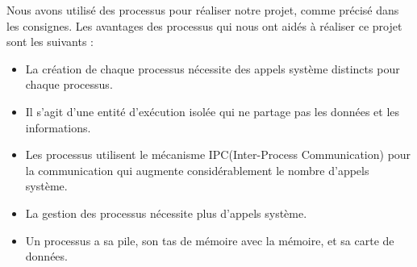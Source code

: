 \documentclass[utf8]{article}
\begin{document}
Nous avons utilisé des processus pour réaliser notre projet, comme précisé dans les consignes. Les avantages des processus qui nous ont aidés à réaliser ce projet sont les suivants :\\
\begin{itemize}
    \item La création de chaque processus nécessite des appels système distincts pour chaque processus.\\
    \item Il s'agit d'une entité d'exécution isolée qui ne partage pas les données et les informations.\\
    \item Les processus utilisent le mécanisme IPC(Inter-Process Communication) pour la communication qui augmente considérablement le nombre d'appels système.\\
    \item La gestion des processus nécessite plus d'appels système.\\
    \item Un processus a sa pile, son tas de mémoire avec la mémoire, et sa carte de données.\\
\end{itemize}
\par
\end{document}
